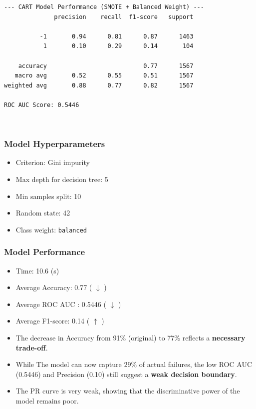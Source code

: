 \documentclass[11pt]{article}
\providecommand{\tightlist}{%
      \setlength{\itemsep}{0pt}\setlength{\parskip}{0pt}}
\begin{document}
    \begin{Verbatim}[commandchars=\\\{\}]
--- CART Model Performance (SMOTE + Balanced Weight) ---
              precision    recall  f1-score   support

          -1       0.94      0.81      0.87      1463
           1       0.10      0.29      0.14       104

    accuracy                           0.77      1567
   macro avg       0.52      0.55      0.51      1567
weighted avg       0.88      0.77      0.82      1567

ROC AUC Score: 0.5446
    \end{Verbatim}

    \begin{center}
    \end{center}
    { \hspace*{\fill} \\}
    
    \subsubsection{Model Hyperparameters}\label{model-hyperparameters}

\begin{itemize}
\tightlist
\item
  Criterion: Gini impurity
\item
  Max depth for decision tree: 5
\item
  Min samples split: 10
\item
  Random state: 42
\item
  Class weight: \texttt{balanced}
\end{itemize}

\subsubsection{Model Performance}\label{model-performance}

\begin{itemize}
\tightlist
\item
  Time: 10.6 (s)
\item
  Average Accuracy: 0.77 ( \(\downarrow\) )
\item
  Average ROC AUC : 0.5446 ( \(\downarrow\) )
\item
  Average F1-score: 0.14 ( \(\uparrow\) )
\item
  The decrease in Accuracy from 91\% (original) to 77\% reflects a
  \textbf{necessary trade-off}.
\item
  While The model can now capture 29\% of actual failures, the low ROC
  AUC (0.5446) and Precision (0.10) still suggest a \textbf{weak
  decision boundary}.
\item
  The PR curve is very weak, showing that the discriminative power of
  the model remains poor.
\end{itemize}
\end{document}

